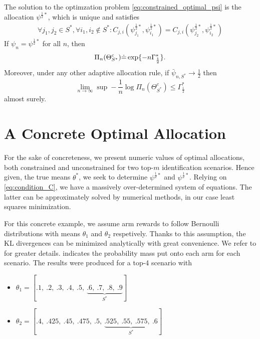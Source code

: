 \begin{proposition}\label{proposition:characterization}
  The solution to the optimzation problem \ref{eq:constrained_optimal_psi} is the allocation $\psi^{\frac{1}{2}*}$, which is unique and satisfies
  \begin{align}
    \forall j_1, j_2 \in S^*, \forall i_1, i_2 \notin S^*: C_{j, i}(\psi^{\frac{1}{2}*}_{j_1}, \psi^{\frac{1}{2}*}_{i_1}) = C_{j, i}(\psi^{\frac{1}{2}*}_{j_2}, \psi^{\frac{1}{2}*}_{i_2})\label{eq:condition_C}
  \end{align}
  If $\psi_n = \psi^{\frac{1}{2}*}$ for all $n$, then
  \[\Pi_n(\Theta_{S^*}^c) \dot{=} \exp \{-n\Gamma^*_{\frac{1}{2}}\}.\]
  Moreover, under any other adaptive allocation rule, if $\bar{\psi}_{n, S^*} \rightarrow \frac{1}{2}$ then
  \[\lim_{n \rightarrow \infty} \sup - \frac{1}{n} \log \Pi_n(\Theta^c_{S^*}) \leq \Gamma^*_{\frac{1}{2}}\]
  almost surely.
\end{proposition}

\section{A Concrete Optimal Allocation}\label{section:conrete_optimal_allocation}
For the sake of concreteness, we present numeric values of optimal allocations, both constrained and unconstrained for two top-$m$ identification scenarios.
Hence given, the true means $\theta^*$, we seek to determine $\psi^{\frac{1}{2}*}$ and $\psi^{\frac{1}{2}*}$. Relying on \eqref{eq:condition_C}, we have a massively over-determined system of equations. The latter can be approximately solved by numerical methods, in our case least squares minimization.

For this concrete example, we assume arm rewards to follow Bernoulli distributions with means $\theta_1$ and $\theta_2$ respetively. Thanks to this assumption, the KL divergences can be minimized analytically with great convenience. We refer to  for greater details.  indicates the probability mass put onto each arm for each scenario. The results were produced for a top-4 scenario with
\begin{itemize}
  \item $\theta_1 = [.1,\ .2,\ .3,\ .4,\ .5,\ \underbrace{.6,\ .7,\ .8,\ .9}_\text{$S^*$}]$
  \item $\theta_2 = [.4,\ .425,\ .45,\ .475,\ .5,\ \underbrace{.525,\ .55,\ .575,\ .6}_\text{$S^*$}]$
\end{itemize}

